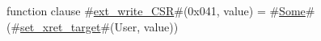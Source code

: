 function clause #\hyperref[sailRISCVzextzywritezyCSR]{ext\_write\_CSR}#(0x041, value) = { #\hyperref[sailRISCVzSome]{Some}#(#\hyperref[sailRISCVzsetzyxretzytarget]{set\_xret\_target}#(User, value)) }

